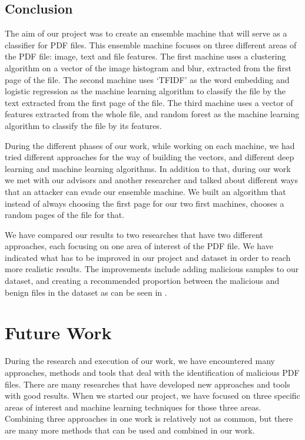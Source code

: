 \documentclass{article}
\begin{document}
\subsection{Conclusion}
\indent The aim of our project was to create an ensemble machine that will serve as a classifier for PDF files. This ensemble machine focuses on three different areas of the PDF file: image, text and file features. The first machine uses a clustering algorithm on a vector of the image histogram and blur, extracted from the first page of the file. The second machine uses ‘TFIDF’ as the word embedding and logistic regression as the machine learning algorithm to classify the file by the text extracted from the first page of the file. The third machine uses a vector of features extracted from the whole file, and random forest as the machine learning algorithm to classify the file by its features.

\indent During the different phases of our work, while working on each machine, we had tried different approaches for the way of building the vectors, and different deep learning and machine learning algorithms. In addition to that, during our work we met with our advisors and another researcher and talked about different ways that an attacker can evade our ensemble machine. We built an algorithm that instead of always choosing the first page for our two first machines, chooses a random pages of the file for that. 

\indent We have compared our results to two researches that have two different approaches, each focusing on one area of interest of the PDF file. We have indicated what has to be improved in our project and dataset in order to reach more realistic results. The improvements include adding malicious samples to our dataset, and creating a recommended proportion between the malicious and benign files in the dataset as can be seen in \cite{BGU2014malicious}.

\section{Future Work}
\indent During the research and execution of our work, we have encountered many approaches, methods and tools that deal with the identification of malicious PDF files. There are many researches that have developed new approaches and tools with good results. When we started our project, we have focused on three specific areas of interest and machine learning techniques for those three areas. Combining three approaches in one work is relatively not as common, but there are many more methods that can be used and combined in our work. 
\end{document}
